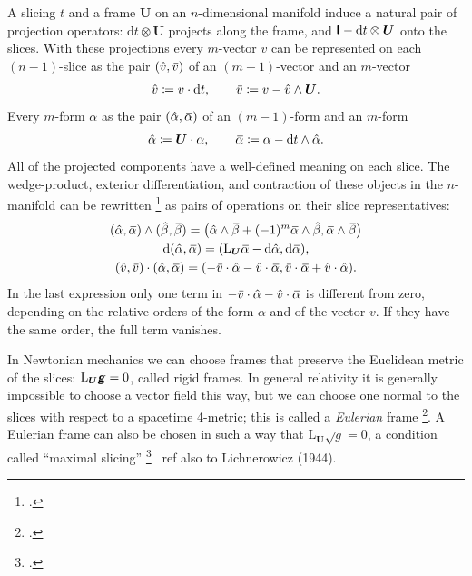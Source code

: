 \documentclass[\ifafour a4paper,12pt,\else a5paper,10pt,\fi%
onecolumn,oneside,article,%
british%
]{memoir}
\theoremstyle{remark}
\theoremstyle{innote}
\newcommand*{\mathte}[1]{\textbf{\textit{\textsf{#1}}}}
\newcommand*{\citep}{\footcites}
\newcommand*{\di}{\mathrm{d}}%
\newcommand*{\defd}{\coloneqq}
\renewcommand*{\|}[1][]{\nonscript\,#1\vert\nonscript\;\mathopen{}}
\newcommand*{\sect}{\S}%
\newcommand*{\wrench}{{\fontencoding{U}\fontfamily{fontawesomethree}\selectfont\symbol{114}}}
\newcommand{\mynote}[1]{ {\color{notecolour}\wrench\ #1}}
\newcommand*{\widebar}[1]{{\mkern1.5mu\skew{2}\overline{\mkern-1.5mu#1\mkern-1.5mu}\mkern 1.5mu}}
\newcommand*{\Li}{\mathrm{L}}
\newcommand*{\yFF}{U}
\newcommand*{\yF}{\bm{\yFF}}
\newcommand*{\ygg}{g}
\newcommand*{\yg}{\mathte{\ygg}}
\newcommand*{\ygv}{\sqrt{\ygg}}
\newcommand*{\yI}{\textsf{\textbf{I}}}
\newcommand*{\yah}{\Hat{\alpha}}
\newcommand*{\yaw}{\widebar{\alpha}}
\newcommand*{\ybh}{\Hat{\beta}}
\newcommand*{\ybw}{\widebar{\beta}}
\newcommand*{\yvh}{\Hat{v}}
\newcommand*{\yvw}{\widebar{v}}
\begin{document}
A slicing $t$ and a frame $\yF$ on an $n$-dimensional manifold induce a
natural pair of projection operators: $\di t\otimes\yF$ projects along the
frame, and $\yI - \di t \otimes\yF$ onto the slices. With these projections
every $m$-vector $v$ can be represented on each $(n-1)$-slice as the pair
$(\yvh, \yvw)$ of an $(m-1)$-vector and an $m$-vector
\begin{equation}
  \label{eq:projection_vector}
  \yvh \defd v\cdot \di t,
  \qquad
  \yvw \defd v - \yvh\land \yF.
\end{equation}
Every $m$-form $\alpha$ as the pair $(\yah, \yaw)$ of an $(m-1)$-form and
an $m$-form
\begin{equation}
  \label{eq:projection_form}
  \yah \defd \yF \cdot \alpha,
  \qquad
  \yaw \defd \alpha - \di t \land \yah.
\end{equation}
All of the projected components have a well-defined meaning on each slice.
The wedge-product, exterior differentiation, and contraction of these
objects in the $n$-manifold can be rewritten
\citep[\sect~B.1.4]{hehletal2003} as pairs of operations on their slice
representatives:
\begin{gather}
  \label{eq:wedge_projection}
  (\yah, \yaw) \land (\ybh, \ybw) = \bigl(
  \yah \land \ybw +(-1)^m \yaw \land \ybh,
  \yaw \land \ybw \bigr)
  \\
  \label{eq:d_projection}
  \di(\yah, \yaw) = ( \Li_{\yF}\yaw - \di\yah, \di\yaw),
  \\
  \label{eq:contraction_projection}
  (\yvh, \yvw) \cdot (\yah, \yaw) =
  (-\yvw \cdot \yah-\yvh \cdot \yaw, \yvw \cdot \yaw + \yvh \cdot \yah).
\end{gather}
In the last expression only one term in $-\yvw \cdot \yah-\yvh \cdot \yaw$
is different from zero, depending on the relative orders of the form
$\alpha$ and of the vector $v$. If they have the same order, the full
term vanishes.

\medskip

In Newtonian mechanics we can choose frames that preserve the Euclidean
metric of the slices: $\Li_{\yF}\yg = 0$, called rigid frames. In general
relativity it is generally impossible to choose a vector field this way,
but we can choose one normal to the slices with respect to a spacetime
4-metric; this is called a \emph{Eulerian} frame
\citep{smarretal1978,smarretal1980}. A Eulerian frame can also be chosen in
such a way that $\Li_{\yF}\ygv=0$, a condition called \enquote{maximal
  slicing} \citep[\sect~III.B]{smarretal1978} \mynote{ref also to
  Lichnerowicz (1944)}.
\end{document}
